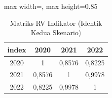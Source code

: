 \begin{table}[H]
\centering
\caption{Matriks RV Indikator (Identik Kedua Skenario)} \label{tab:samplerv_s}
\begin{adjustbox}{max width=\textwidth, max height=0.85\textheight}
\begin{tabular}{|c|c|c|c|}
\hline
\textbf{index} & \textbf{2020} & \textbf{2021} & \textbf{2022} \\
\hline
2020 & 1 & 0,8576 & 0,8225 \\
2021 & 0,8576 & 1 & 0,9978 \\
2022 & 0,8225 & 0,9978 & 1 \\
\hline
\end{tabular}
\end{adjustbox}
\end{table}